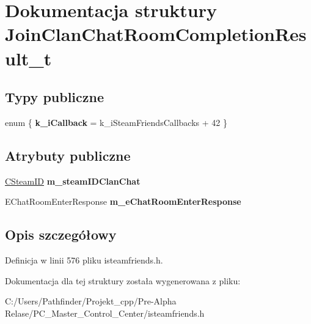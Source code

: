 \hypertarget{struct_join_clan_chat_room_completion_result__t}{}\section{Dokumentacja struktury Join\+Clan\+Chat\+Room\+Completion\+Result\+\_\+t}
\label{struct_join_clan_chat_room_completion_result__t}
\subsection*{Typy publiczne}
\begin{DoxyCompactItemize}
\item 
\mbox{\label{struct_join_clan_chat_room_completion_result__t_a2d16cbcb98972eaa5bc5faa5ec10ab36}} 
enum \{ {\bfseries k\+\_\+i\+Callback} = k\+\_\+i\+Steam\+Friends\+Callbacks + 42
 \}
\end{DoxyCompactItemize}
\subsection*{Atrybuty publiczne}
\begin{DoxyCompactItemize}
\item 
\mbox{\label{struct_join_clan_chat_room_completion_result__t_acba80a75a04476acdb57ce036e3941a9}} 
\hyperlink{class_c_steam_i_d}{C\+Steam\+ID} {\bfseries m\+\_\+steam\+I\+D\+Clan\+Chat}
\item 
\mbox{\label{struct_join_clan_chat_room_completion_result__t_adbca976ba4faeefc1a2cd6227dc443d7}} 
E\+Chat\+Room\+Enter\+Response {\bfseries m\+\_\+e\+Chat\+Room\+Enter\+Response}
\end{DoxyCompactItemize}


\subsection{Opis szczegółowy}


Definicja w linii 576 pliku isteamfriends.\+h.



Dokumentacja dla tej struktury została wygenerowana z pliku\+:\begin{DoxyCompactItemize}
\item 
C\+:/\+Users/\+Pathfinder/\+Projekt\+\_\+cpp/\+Pre-\/\+Alpha Relase/\+P\+C\+\_\+\+Master\+\_\+\+Control\+\_\+\+Center/isteamfriends.\+h\end{DoxyCompactItemize}
